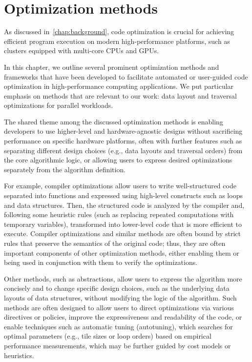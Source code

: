 \chapter{Optimization methods}\label{chap:optimization-methods}

As discussed in~\cref{chap:background}, code optimization is crucial for achieving efficient program execution on modern high-performance platforms, such as clusters equipped with multi-core CPUs and GPUs.

In this chapter, we outline several prominent optimization methods and frameworks that have been developed to facilitate automated or user-guided code optimization in high-performance computing applications. We put particular emphasis on methods that are relevant to our work: data layout and traversal optimizations for parallel workloads.

The shared theme among the discussed optimization methods is enabling developers to use higher-level and hardware-agnostic designs without sacrificing performance on specific hardware platforms, often with further features such as separating different design choices (e.g., data layouts and traversal orders) from the core algorithmic logic, or allowing users to express desired optimizations separately from the algorithm definition.

For example, compiler optimizations allow users to write well-structured code separated into functions and expressed using high-level constructs such as loops and data structures. Then, the structured code is analyzed by the compiler and, following some heuristic rules (such as replacing repeated computations with temporary variables), transformed into lower-level code that is more efficient to execute. Compiler optimizations and similar methods are often bound by strict rules that preserve the semantics of the original code; thus, they are often important components of other optimization methods, either enabling them or being used in conjunction with them to verify the optimizations.

Other methods, such as abstractions, allow users to express the algorithm more concisely and to change specific design choices, such as the underlying data layouts of data structures, without modifying the logic of the algorithm. Such methods are often designed to allow users to direct optimizations via various directives or policies, improve the expressiveness and readability of the code, or enable techniques such as automatic tuning (autotuning), which searches for optimal parameters (e.g., tile sizes or loop orders) based on empirical performance measurements, which may be further guided by cost models or heuristics.

